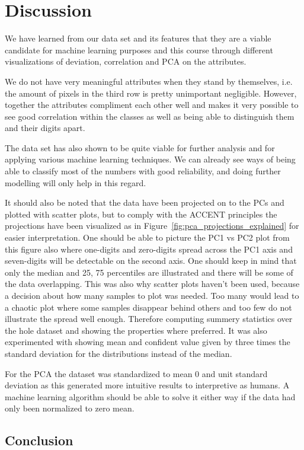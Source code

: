 \chapter{Discussion}
We have learned from our data set and its features that they are a viable candidate for machine learning purposes and this course through different visualizations of deviation, correlation and PCA on the attributes. 

We do not have very meaningful attributes when they stand by themselves, i.e. the amount of pixels in the third row is pretty unimportant negligible. However, together the attributes compliment each other well and makes it very possible to see good correlation within the classes as well as being able to distinguish them and their digits apart.

The data set has also shown to be quite viable for further analysis and for applying various machine learning techniques. We can already see ways of being able to classify most of the numbers with good reliability, and doing further modelling will only help in this regard.

It should also be noted that the data have been projected on to the PCs and plotted with scatter plots, but to comply with the ACCENT principles the projections have been visualized as in Figure~\ref{fig:pca_projections_explained} for easier interpretation. One should be able to picture the PC1 vs PC2 plot from this figure also where one-digits and zero-digits spread across the PC1 axis and seven-digits will be detectable on the second axis.  
One should keep in mind that only the median and 25, 75 percentiles are illustrated and there will be some of the data overlapping. This was also why scatter plots haven’t been used, because a decision about how many samples to plot was needed. Too many would lead to a chaotic plot where some samples disappear behind others and too few do not illustrate the spread well enough. Therefore computing summery statistics over the hole dataset and showing the properties where preferred. It was also experimented with showing mean and confident value given by three times the standard deviation for the distributions instead of the median.

For the PCA the dataset was standardized to mean 0 and unit standard deviation as this generated more intuitive results to interpretive as humans. A machine learning algorithm should be able to solve it either way if the data had only been normalized to zero mean. 
\section{Conclusion}
